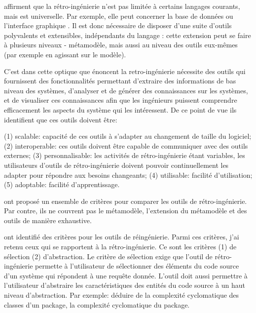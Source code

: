 \documentclass[a4paper]{article}
\begin{document}
\citet{Brun14c} affirment que la rétro-ingénierie n'est pas limitée à certains langages courants, mais est universelle. 
Par exemple, elle peut concerner la base de données \cite{Delp20a} ou l'interface graphique \cite{Verh19a}.
Il est donc nécessaire de disposer d'une suite d'outils polyvalents et extensibles, indépendants du langage : cette extension peut se faire à plusieurs niveaux - métamodèle, mais aussi au niveau des outils eux-mêmes (par exemple en agissant sur le modèle).

C'est dans cette optique que \citet{Kien10a} énoncent la retro-ingénierie nécessite des outils qui fournissent des fonctionnalités permettant d'extraire des informations de bas niveau des systèmes, d'analyser et de générer des connaissances sur les systèmes, et de visualiser ces connaissances afin que les ingénieurs puissent comprendre efficacement les aspects du système qui les intéressent.
De ce point de vue ils identifient que ces outils doivent être:

  (1) scalable: capacité de ces outils à s'adapter au changement de taille du logiciel;
  (2) interoperable: ces outils doivent être capable de communiquer avec des outils externes;
 (3) personnalisable: les activités de rétro-ingénierie étant variables, les utilisateurs d'outils de rétro-ingénierie doivent pouvoir continuellement
 les  adapter pour répondre aux besoins changeants;
 (4) utilisable: facilité d'utilisation;
(5) adoptable: facilité d'apprentissage.


\citet{Bell98a} ont proposé un ensemble de critères pour comparer les outils de rétro-ingénierie.
Par contre, ils ne couvrent pas le métamodèle, l'extension du métamodèle et des outils de manière exhaustive.

\citet{Govi18a} ont identifié des critères pour les outils de réingénierie. 
Parmi ces critères, j'ai retenu ceux qui se rapportent à la rétro-ingénierie.
Ce sont les critères (1) de sélection (2) d'abstraction.  
Le critère de sélection exige que l'outil de rétro-ingénierie permette à l'utilisateur de sélectionner des éléments  du code source d'un système 
qui répondent à une requête donnée.
L'outil doit aussi permettre à l'utilisateur d'abstraire les caractéristiques des entités du code source à un haut niveau d'abstraction. 
Par exemple: déduire de la complexité cyclomatique des classes d'un package, la complexité cyclomatique du package.
\end{document}
